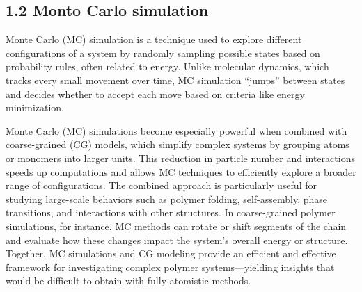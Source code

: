 \documentclass[12pt]{article}
\begin{document}
\begin{flushleft}
	
	
\vspace{-1em} 

\subsection*{1.2 Monto Carlo simulation}



Monte Carlo (MC) simulation is a technique used to explore different configurations of a system by randomly sampling possible states based on probability rules, often related to energy. Unlike molecular dynamics, which tracks every small movement over time, MC simulation “jumps” between states and decides whether to accept each move based on criteria like energy minimization.

Monte Carlo (MC) simulations become especially powerful when combined with coarse-grained (CG) models, which simplify complex systems by grouping atoms or monomers into larger units. This reduction in particle number and interactions speeds up computations and allows MC techniques to efficiently explore a broader range of configurations. The combined approach is particularly useful for studying large-scale behaviors such as polymer folding, self-assembly, phase transitions, and interactions with other structures. In coarse-grained polymer simulations, for instance, MC methods can rotate or shift segments of the chain and evaluate how these changes impact the system’s overall energy or structure. Together, MC simulations and CG modeling provide an efficient and effective framework for investigating complex polymer systems—yielding insights that would be difficult to obtain with fully atomistic methods.

\end{flushleft}
\end{document}
